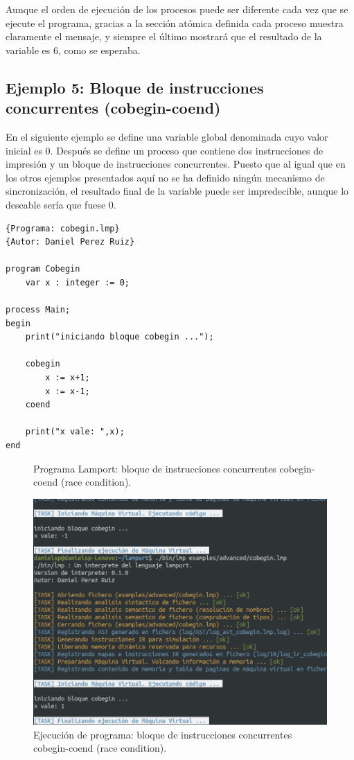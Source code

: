 Aunque el orden de ejecución de los procesos puede ser diferente cada vez que se ejecute el programa, gracias a la sección atómica definida cada proceso muestra claramente el mensaje, y siempre el último mostrará que el resultado de la variable  es 6, como se esperaba.

\newpage
\subsection{Ejemplo 5: Bloque de instrucciones concurrentes (cobegin-coend)}
En el siguiente ejemplo se define una variable global denominada  cuyo valor inicial es 0. Después se define un proceso  que contiene dos instrucciones de impresión y un bloque de instrucciones concurrentes. Puesto que al igual que en los otros ejemplos presentados aquí no se ha definido ningún mecanismo de sincronización, el resultado final de la variable  puede ser impredecible, aunque lo deseable sería que fuese 0.
\begin{lstlisting}[style=lamportStyle]
{Programa: cobegin.lmp}
{Autor: Daniel Perez Ruiz}

program Cobegin
	var x : integer := 0;
	
process Main;
begin
	print("iniciando bloque cobegin ...");

	cobegin
		x := x+1;
		x := x-1;
	coend
	
	print("x vale: ",x);
end
\end{lstlisting}
\begin{figure}[h]
\caption{Programa Lamport: bloque de instrucciones concurrentes cobegin-coend (race condition).}
\label{fig:lamportCobegin}
\end{figure}

\newpage

\begin{figure}[h]
    \includegraphics[width=\linewidth]{images/ejemplos/concurrentes/cobegin.png}
    \caption{Ejecución de programa: bloque de instrucciones concurrentes cobegin-coend (race condition).}
    \label{fig:lamportCobegin_exec}
\end{figure}

